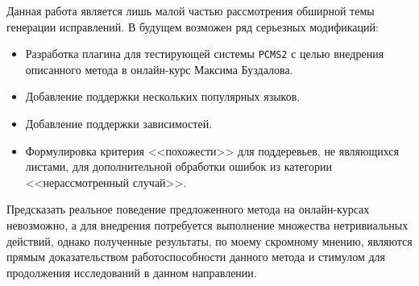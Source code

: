 \documentclass[times,specification,annotation]{itmo-student-thesis}
\begin{document}
Данная работа является лишь малой частью рассмотрения обширной темы генерации исправлений. В будущем возможен ряд серьезных
модификаций:
\begin{itemize}
    \item Разработка плагина для тестирующей системы \texttt{PCMS2} с целью внедрения описанного метода в онлайн-курс
        Максима Буздалова.
    \item Добавление поддержки нескольких популярных языков.
    \item Добавление поддержки зависимостей.
    \item Формулировка критерия <<похожести>> для поддеревьев, не являющихся листами, для дополнительной обработки ошибок из
        категории <<нерассмотренный случай>>.
\end{itemize}

Предсказать реальное поведение предложенного метода на онлайн-курсах невозможно, а для внедрения потребуется выполнение множества
нетривиальных действий, однако полученные результаты, по моему скромному мнению, являются прямым доказательством работоспособности 
данного метода и стимулом для продолжения исследований в данном направлении.



\printmainbibliography
\end{document}
